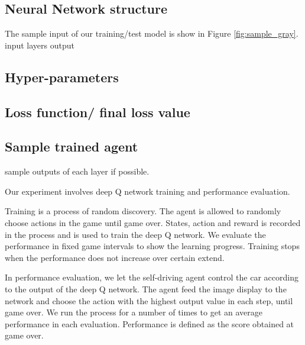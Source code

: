 \documentclass[a4paper]{article}
\begin{document}
\subsection{Neural Network structure}

The sample input of our training/test model is show in Figure \ref{fig:sample_gray}.
input layers output
\subsection{Hyper-parameters}
\subsection{Loss function/ final loss value}
\subsection{Sample trained agent}
sample outputs of each layer if possible.

Our experiment involves deep Q network training and performance evaluation. 

Training is a process of random discovery. The agent is allowed to randomly choose actions in the
game until game over. States, action and reward is recorded in the process and is used to train
the deep Q network. We evaluate the performance in fixed game intervals to show the learning
progress. Training stops when the performance does not increase over certain extend.

In performance evaluation, we let the self-driving agent control the car according to the output
of the deep Q network. The agent feed the image display to the network and choose the action with
the highest output value in each step, until game over. We run the process for a number of times
to get an average performance in each evaluation. Performance is defined as the score obtained at
game over.





\end{document}
